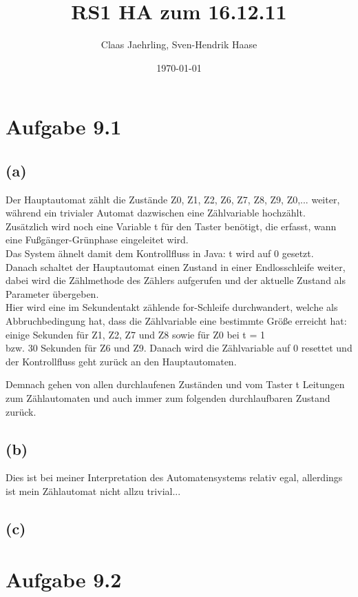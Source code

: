 \documentclass[12pt]{article}
\author{Claas Jaehrling, Sven-Hendrik Haase}
\title{RS1 HA zum 16.12.11}
\date{\today}
\begin{document}
\setcounter{secnumdepth}{0}
\maketitle

\section{Aufgabe 9.1}
\subsection{(a)}
Der Hauptautomat zählt die Zustände Z0, Z1, Z2, Z6, Z7,
Z8, Z9, Z0,... weiter, während ein trivialer Automat dazwischen eine
Zählvariable hochzählt. \\
Zusätzlich wird noch eine Variable t für den Taster benötigt, die
erfasst, wann eine Fußgänger-Grünphase eingeleitet wird. \\
Das System ähnelt damit dem Kontrollfluss in Java:
t wird auf 0 gesetzt. \\
Danach schaltet der Hauptautomat einen Zustand in einer
Endlosschleife weiter, dabei wird die Zählmethode des Zählers
aufgerufen und der aktuelle Zustand als Parameter übergeben.\\
Hier wird eine im Sekundentakt zählende for-Schleife durchwandert,
welche als Abbruchbedingung hat, dass die Zählvariable eine
bestimmte Größe erreicht hat: \\
einige Sekunden für Z1, Z2, Z7 und Z8 sowie für Z0 bei t = 1  \\
bzw. 30 Sekunden für Z6 und Z9.
Danach wird die Zählvariable auf 0 resettet und der Kontrollfluss
geht zurück an den Hauptautomaten.

Demnach gehen von allen durchlaufenen Zuständen und vom Taster t
Leitungen zum Zählautomaten und auch immer zum folgenden
durchlaufbaren Zustand zurück.
\subsection{(b)}
Dies ist bei meiner Interpretation des Automatensystems relativ egal,
allerdings ist mein Zählautomat nicht allzu trivial...
\subsection{(c)}


\section{Aufgabe 9.2}
\end{document}
